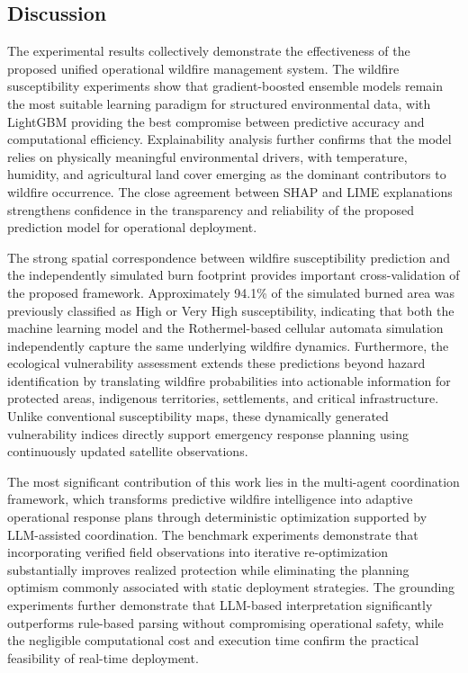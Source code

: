 \documentclass{ieeeaccess}
\begin{document}
\subsection{Discussion}
\label{sec:discussion}

The experimental results collectively demonstrate the effectiveness of the proposed unified operational wildfire management system. The wildfire susceptibility experiments show that gradient-boosted ensemble models remain the most suitable learning paradigm for structured environmental data, with LightGBM providing the best compromise between predictive accuracy and computational efficiency. Explainability analysis further confirms that the model relies on physically meaningful environmental drivers, with temperature, humidity, and agricultural land cover emerging as the dominant contributors to wildfire occurrence. The close agreement between SHAP and LIME explanations strengthens confidence in the transparency and reliability of the proposed prediction model for operational deployment.

The strong spatial correspondence between wildfire susceptibility prediction and the independently simulated burn footprint provides important cross-validation of the proposed framework. Approximately 94.1\% of the simulated burned area was previously classified as High or Very High susceptibility, indicating that both the machine learning model and the Rothermel-based cellular automata simulation independently capture the same underlying wildfire dynamics. Furthermore, the ecological vulnerability assessment extends these predictions beyond hazard identification by translating wildfire probabilities into actionable information for protected areas, indigenous territories, settlements, and critical infrastructure. Unlike conventional susceptibility maps, these dynamically generated vulnerability indices directly support emergency response planning using continuously updated satellite observations.

The most significant contribution of this work lies in the multi-agent coordination framework, which transforms predictive wildfire intelligence into adaptive operational response plans through deterministic optimization supported by LLM-assisted coordination. The benchmark experiments demonstrate that incorporating verified field observations into iterative re-optimization substantially improves realized protection while eliminating the planning optimism commonly associated with static deployment strategies. The grounding experiments further demonstrate that LLM-based interpretation significantly outperforms rule-based parsing without compromising operational safety, while the negligible computational cost and execution time confirm the practical feasibility of real-time deployment.
\end{document}
